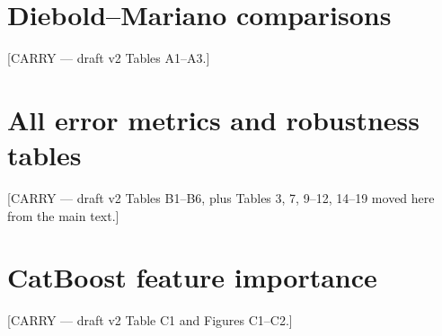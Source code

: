 \documentclass[review,3p,times]{elsarticle}
\newcommand{\carry}[1]{\textsf{\small [CARRY --- #1]}}
\begin{document}
\appendix
\section{Diebold--Mariano comparisons}
\carry{draft v2 Tables A1--A3.}
\section{All error metrics and robustness tables}
\carry{draft v2 Tables B1--B6, plus Tables 3, 7, 9--12, 14--19 moved here from
the main text.}
\section{CatBoost feature importance}
\carry{draft v2 Table C1 and Figures C1--C2.}
\end{document}

